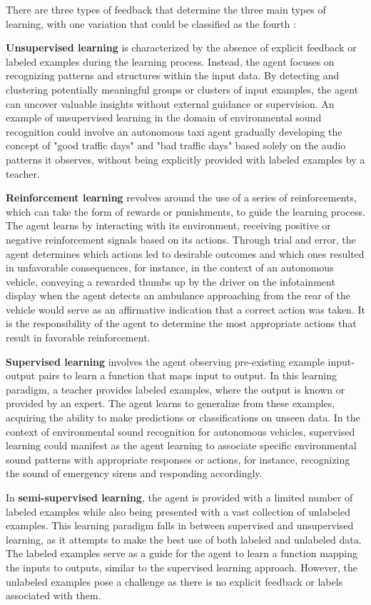 There are three types of feedback that determine the three main types of learning, with one variation that could be classified as the fourth \cite{Russel2010}:

\textbf{Unsupervised learning} is characterized by the absence of explicit feedback or labeled examples during the learning process. Instead, the agent focuses on recognizing patterns and structures within the input data. By detecting and clustering potentially meaningful groups or clusters of input examples, the agent can uncover valuable insights without external guidance or supervision. An example of unsupervised learning in the domain of environmental sound recognition could involve an autonomous taxi agent gradually developing the concept of "good traffic days" and "bad traffic days" based solely on the audio patterns it observes, without being explicitly provided with labeled examples by a teacher.

\textbf{Reinforcement learning} revolves around the use of a series of reinforcements, which can take the form of rewards or punishments, to guide the learning process. The agent learns by interacting with its environment, receiving positive or negative reinforcement signals based on its actions. Through trial and error, the agent determines which actions led to desirable outcomes and which ones resulted in unfavorable consequences, for instance, in the context of an autonomous vehicle, conveying a rewarded thumbs up by the driver on the infotainment display when the agent detects an ambulance approaching from the rear of the vehicle would serve as an affirmative indication that a correct action was taken. It is the responsibility of the agent to determine the most appropriate actions that result in favorable reinforcement.

\textbf{Supervised learning} involves the agent observing pre-existing example input-output pairs to learn a function that maps input to output. In this learning paradigm, a teacher provides labeled examples, where the output is known or provided by an expert. The agent learns to generalize from these examples, acquiring the ability to make predictions or classifications on unseen data. In the context of environmental sound recognition for autonomous vehicles, supervised learning could manifest as the agent learning to associate specific environmental sound patterns with appropriate responses or actions, for instance, recognizing the sound of emergency sirens and responding accordingly.

In \textbf{semi-supervised learning}, the agent is provided with a limited number of labeled examples while also being presented with a vast collection of unlabeled examples. This learning paradigm falls in between supervised and unsupervised learning, as it attempts to make the best use of both labeled and unlabeled data. The labeled examples serve as a guide for the agent to learn a function mapping the inputs to outputs, similar to the supervised learning approach. However, the unlabeled examples pose a challenge as there is no explicit feedback or labels associated with them.

